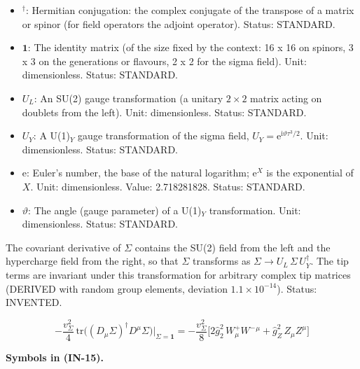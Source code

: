 \documentclass[
  10pt,
]{article}
\begin{document}
\begin{itemize}
  \(\mathrm{GeV}^{2}\) (field strength). Status: ASSUMED.
\item
  \({}^\dagger\): Hermitian conjugation: the complex conjugate of the
  transpose of a matrix or spinor (for field operators the adjoint
  operator). Status: STANDARD.
\item
  \(\mathbf{1}\): The identity matrix (of the size fixed by the context:
  16 x 16 on spinors, 3 x 3 on the generations or flavours, 2 x 2 for
  the sigma field). Unit: dimensionless. Status: STANDARD.
\item
  \(U_L\): An SU(2) gauge transformation (a unitary \(2 \times 2\)
  matrix acting on doublets from the left). Unit: dimensionless. Status:
  STANDARD.
\item
  \(U_Y\): A U(1)\(_Y\) gauge transformation of the sigma field,
  \(U_Y = \mathrm{e}^{\mathrm{i}\vartheta\tau^3/2}\). Unit:
  dimensionless. Status: STANDARD.
\item
  \(\mathrm{e}\): Euler's number, the base of the natural logarithm;
  \(\mathrm{e}^{X}\) is the exponential of \(X\). Unit: dimensionless.
  Value: 2.718281828. Status: STANDARD.
\item
  \(\vartheta\): The angle (gauge parameter) of a U(1)\(_Y\)
  transformation. Unit: dimensionless. Status: STANDARD.
\end{itemize}

The covariant derivative of \(\Sigma\) contains the SU(2) field from the
left and the hypercharge field from the right, so that \(\Sigma\)
transforms as \(\Sigma \to U_L\,\Sigma\,U_Y^\dagger\). The tip terms are
invariant under this transformation for arbitrary complex tip matrices
(DERIVED with random group elements, deviation \(1.1\times10^{-14}\)).
Status: INVENTED.

\[
-\frac{v_\Sigma^2}{4}\,\mathrm{tr}\big((D_\mu\Sigma)^\dagger D^\mu\Sigma\big)\Big\vert_{\Sigma = \mathbf{1}}
= -\frac{v_\Sigma^2}{8}\Big[2\hat g_2^2\,W^+_\mu W^-{}^\mu + \hat g_Z^2\,Z_\mu Z^\mu\Big] \tag{IN-15}
\]

\textbf{Symbols in (IN-15).}
\end{document}
